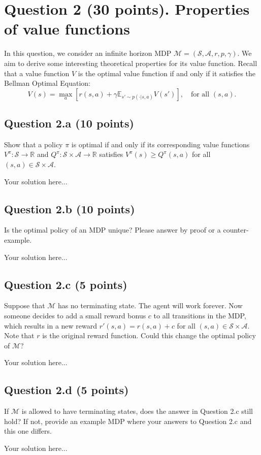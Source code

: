 \documentclass[12pt]{article}
\begin{document}
\section*{Question 2 (30 points). Properties of value functions}
In this question, we consider an infinite horizon MDP $\mathcal{M} = (\mathcal{S}, \mathcal{A}, r, p, \gamma)$. We aim to derive some interesting theoretical properties for its value function.
{Recall that a value function $V$ is the optimal value function if and only if it satisfies the Bellman Optimal Equation:
\[
    V(s) = \max_a \left[r(s,a) + \gamma \mathbb{E}_{s'\sim p(\cdot|s,a)} V(s')  \right],\quad \text{for all } (s,a).
\]}
\subsection*{Question 2.a (10 points)} 
Show that a policy $\pi$ is optimal if and only if its corresponding value functions  $V^\pi: \mathcal{S} \rightarrow \mathbb{R}$ and $Q^\pi: \mathcal{S} \times \mathcal{A} \rightarrow \mathbb{R}$ satisfies $V^{\pi}(s)\geq Q^{\pi}(s,a)$  for all $(s,a) \in \mathcal{S} \times \mathcal{A}$.
\begin{solution}
Your solution here...
\end{solution}

\subsection*{Question 2.b (10 points)}
Is the optimal policy of an MDP unique? Please answer by proof or a counter-example.
\begin{solution}
Your solution here...
\end{solution}
\subsection*{Question 2.c (5 points)}
Suppose that $\mathcal{M}$ has no terminating state. The agent will work forever. Now someone decides to add a small reward bonus $c$ to all transitions in the MDP, which results in a new reward $r'(s,a) = r(s,a)+c$ for all $(s,a)\in \mathcal{S}\times\mathcal{A}$. Note that $r$ is the original reward function. Could this change the optimal policy of $\mathcal{M}$?
\begin{solution}
    Your solution here...
\end{solution}
\subsection*{Question 2.d (5 points)}
If $\mathcal{M}$ is allowed to have terminating states, does the answer in Question 2.c still hold? If not,  provide an example MDP where your answers to Question 2.c and this one differs.
\begin{solution}
    Your solution here...
\end{solution}
\end{document}
